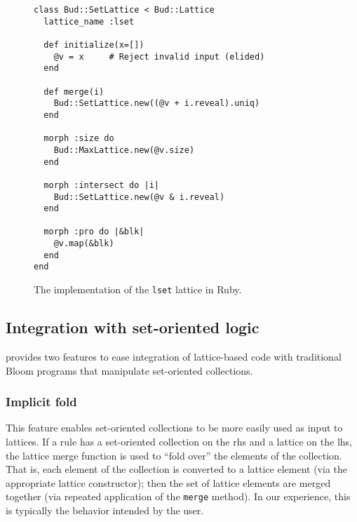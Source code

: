\begin{figure}[t]
\begin{scriptsize}
\begin{lstlisting}
class Bud::SetLattice < Bud::Lattice
  lattice_name :lset

  def initialize(x=[])
    @v = x     # Reject invalid input (elided)
  end

  def merge(i)
    Bud::SetLattice.new((@v + i.reveal).uniq)
  end

  morph :size do
    Bud::MaxLattice.new(@v.size)
  end

  morph :intersect do |i|
    Bud::SetLattice.new(@v & i.reveal)
  end

  morph :pro do |&blk|
    @v.map(&blk)
  end
end
\end{lstlisting}
\end{scriptsize}
\caption{The implementation of the \texttt{lset} lattice in Ruby.}
\label{fig:lattice-set}
\end{figure}

\subsection{Integration with set-oriented logic}
\label{sec:bloom-interop}

\lang provides two features to ease integration of lattice-based code with
traditional Bloom programs that manipulate set-oriented collections.

\subsubsection{Implicit fold}
This feature enables set-oriented collections to be more easily used as input to
lattices. If a \lang rule has a set-oriented collection on the rhs and a lattice
on the lhs, the lattice merge function is used to ``fold over'' the elements of
the collection. That is, each element of the collection is converted to a
lattice element (via the appropriate lattice constructor); then the set of
lattice elements are merged together (via repeated application of the
\texttt{merge} method). In our experience, this is typically the behavior
intended by the user.

